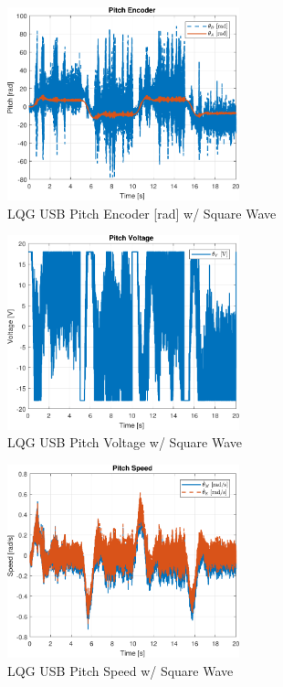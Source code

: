 \documentclass[fontsize=11pt, %
                             paper=letter, %
                             openany, %
                             captions=tableheading,
                             index=totoc,
                             hyperref]{labbook}
\begin{document}
\begin{addmargin}[0cm]{0cm}
\begin{figure}[h]
  \centering
  \includegraphics[width=0.6\textwidth]{figs/matlab/LQG_USB/Pitch_Pos_Rad_LQG_USB_SQU}
  \caption{LQG USB Pitch Encoder [rad] w/ Square Wave}
  \label{fig:Pitch_Pos_Rad_LQG_USB_SQU}
\end{figure}

\begin{figure}[h]
  \centering
  \includegraphics[width=0.6\textwidth]{figs/matlab/LQG_USB/Pitch_Volt_LQG_USB_SQU}
  \caption{LQG USB Pitch Voltage w/ Square Wave}
  \label{fig:Pitch_Volt_LQG_USB_SQU}
\end{figure}

\begin{figure}[h]
  \centering
  \includegraphics[width=0.6\textwidth]{figs/matlab/LQG_USB/Pitch_Speed_LQG_USB_SQU}
  \caption{LQG USB Pitch Speed w/ Square Wave}
  \label{fig:Pitch_Speed_LQG_USB_SQU}
\end{figure}


\end{addmargin}
\end{document}
